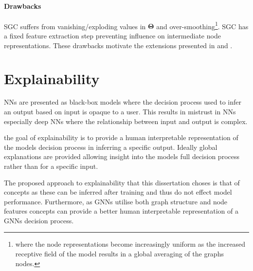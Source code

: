 \paragraph{Drawbacks}
SGC suffers from vanishing/exploding values in $\bm{\Theta}$ and over-smoothing\footnote{where the node representations become increasingly uniform as the increased receptive field of the model results in a global averaging of the graphs nodes.}.
SGC has a fixed feature extraction step preventing influence on intermediate node representations.
These drawbacks motivate the extensions presented in  and .




\section{Explainability}




NNs are presented as black-box models where the decision process used to infer an output based on input is opaque to a user.
This results in mistrust in NNs especially deep NNs where the relationship between input and output is complex.

the goal of explainability is to provide a human interpretable representation of the models decision process in inferring a specific output.
Ideally global explanations are provided allowing insight into the models full decision process rather than for a specific input.

The proposed approach to explainability that this dissertation choses is that of concepts as these can be inferred after training and thus do not effect model performance.
Furthermore, as GNNs utilise both graph structure and node features concepts can provide a better human interpretable representation of a GNNs decision process.

